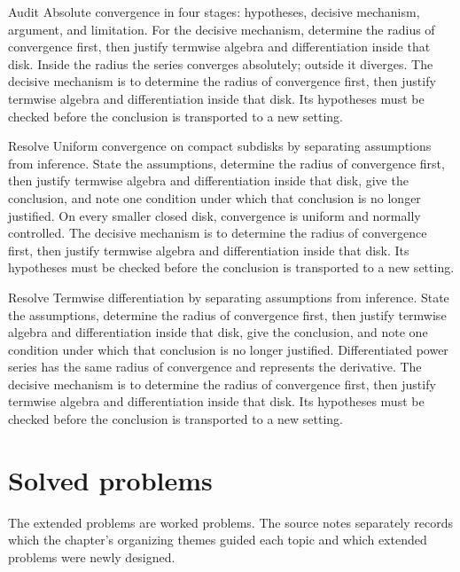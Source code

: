 \begin{example}\label{ex:iv03-worked-02}
Audit Absolute convergence in four stages: hypotheses, decisive mechanism, argument, and limitation. For the decisive mechanism, determine the radius of convergence first, then justify termwise algebra and differentiation inside that disk. Inside the radius the series converges absolutely; outside it diverges. The decisive mechanism is to determine the radius of convergence first, then justify termwise algebra and differentiation inside that disk. Its hypotheses must be checked before the conclusion is transported to a new setting.
\end{example}

\begin{example}\label{ex:iv03-worked-03}
Resolve Uniform convergence on compact subdisks by separating assumptions from inference. State the assumptions, determine the radius of convergence first, then justify termwise algebra and differentiation inside that disk, give the conclusion, and note one condition under which that conclusion is no longer justified. On every smaller closed disk, convergence is uniform and normally controlled. The decisive mechanism is to determine the radius of convergence first, then justify termwise algebra and differentiation inside that disk. Its hypotheses must be checked before the conclusion is transported to a new setting.
\end{example}

\begin{example}\label{ex:iv03-worked-04}
Resolve Termwise differentiation by separating assumptions from inference. State the assumptions, determine the radius of convergence first, then justify termwise algebra and differentiation inside that disk, give the conclusion, and note one condition under which that conclusion is no longer justified. Differentiated power series has the same radius of convergence and represents the derivative. The decisive mechanism is to determine the radius of convergence first, then justify termwise algebra and differentiation inside that disk. Its hypotheses must be checked before the conclusion is transported to a new setting.
\end{example}

\section{Solved problems}
The extended problems are worked problems. The source notes separately records which the chapter's organizing themes guided each topic and which extended problems were newly designed.

